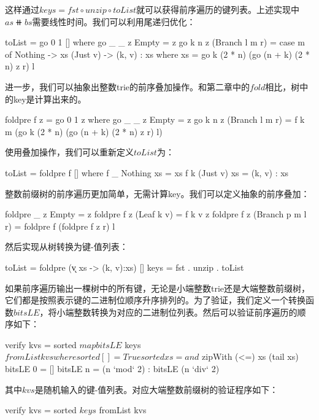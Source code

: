 \documentclass[b5paper]{ctexart}
\begin{document}
\begin{Answer}[ref = {ex:int-tree-lookup}]
{这样通过$keys = fst \circ unzip \circ toList$就可以获得前序遍历的键列表。上述实现中$as \doubleplus bs$需要线性时间。我们可以利用尾递归优化：

\begin{Haskell}
toList = go 0 1 [] where
  go _ _ z Empty = z
  go k n z (Branch l m r) = case m of
    Nothing -> xs
    (Just v) -> (k, v) : xs
    where xs = go k (2 * n) (go (n + k) (2 * n) z r) l
\end{Haskell}

进一步，我们可以抽象出整数trie的前序叠加操作。和第二章中的$fold$相比，树中的key是计算出来的。

\begin{Haskell}
foldpre f z = go 0 1 z where
  go _ _ z Empty = z
  go k n z (Branch l m r) = f k m (go k (2 * n) (go (n + k) (2 * n) z r) l)
\end{Haskell}

使用叠加操作，我们可以重新定义$toList$为：
\begin{Haskell}
toList = foldpre f [] where
  f _ Nothing xs = xs
  f k (Just v) xs = (k, v) : xs
\end{Haskell}

整数前缀树的前序遍历更加简单，无需计算key。我们可以定义抽象的前序叠加：
\begin{Haskell}
foldpre _ z Empty = z
foldpre f z (Leaf k v) = f k v z
foldpre f z (Branch p m l r) = foldpre f (foldpre f z r) l
\end{Haskell}

然后实现从树转换为键-值列表：
\begin{Haskell}
toList = foldpre (\k v xs -> (k, v):xs) []
keys = fst . unzip . toList
\end{Haskell}

如果前序遍历输出一棵树中的所有键，无论是小端整数trie还是大端整数前缀树，它们都是按照表示键的二进制位顺序升序排列的。为了验证，我们定义一个转换函数$bitsLE$，将小端整数转换为对应的二进制位列表。然后可以验证前序遍历的顺序如下：
\begin{Haskell}
verify kvs = sorted $ map bitsLE $ keys $ fromList kvs where
  sorted [] = True
  sorted xs = and $ zipWith (<=) xs (tail xs)
  bitsLE 0 = []
  bitsLE n = (n `mod` 2) : bitsLE (n `div` 2)
\end{Haskell}
其中$kvs$是随机输入的键-值列表。对应大端整数前缀树的验证程序如下：
\begin{Haskell}
verify kvs = sorted $ keys $ fromList kvs
\end{Haskell}
}
\end{Answer}
\end{document}
